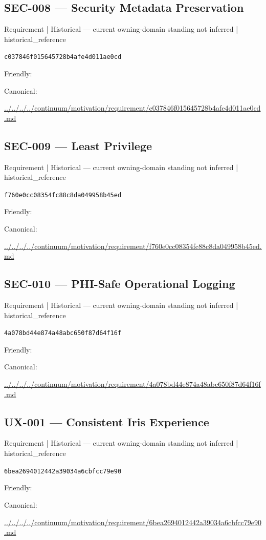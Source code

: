 \documentclass[10pt,a4paper]{article}
\begin{document}
\subsection*{SEC-008 — Security Metadata Preservation}
{\small Requirement | Historical — current owning-domain standing not inferred | historical\_reference}\par
\texttt{c037846f015645728b4afe4d011ae0cd}\par
Friendly: \par
Canonical: \par
{\footnotesize\url{../../../../continuum/motivation/requirement/c037846f015645728b4afe4d011ae0cd.md}}\par
\subsection*{SEC-009 — Least Privilege}
{\small Requirement | Historical — current owning-domain standing not inferred | historical\_reference}\par
\texttt{f760e0cc08354fc88c8da049958b45ed}\par
Friendly: \par
Canonical: \par
{\footnotesize\url{../../../../continuum/motivation/requirement/f760e0cc08354fc88c8da049958b45ed.md}}\par
\subsection*{SEC-010 — PHI-Safe Operational Logging}
{\small Requirement | Historical — current owning-domain standing not inferred | historical\_reference}\par
\texttt{4a078bd44e874a48abc650f87d64f16f}\par
Friendly: \par
Canonical: \par
{\footnotesize\url{../../../../continuum/motivation/requirement/4a078bd44e874a48abc650f87d64f16f.md}}\par
\subsection*{UX-001 — Consistent Iris Experience}
{\small Requirement | Historical — current owning-domain standing not inferred | historical\_reference}\par
\texttt{6bea2694012442a39034a6cbfcc79e90}\par
Friendly: \par
Canonical: \par
{\footnotesize\url{../../../../continuum/motivation/requirement/6bea2694012442a39034a6cbfcc79e90.md}}\par
\end{document}
